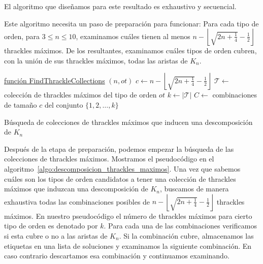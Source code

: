   El algoritmo que diseñamos para este resultado es exhaustivo y secuencial.

  Este algoritmo necesita un paso de preparación para funcionar: Para cada tipo de orden,
  para $3\leq n \leq 10$, examinamos cuáles tienen al menos $n - \left\lfloor\sqrt{2n +
  \frac{1}{4}} - \frac{1}{2}\right\rfloor$ thrackles máximos. De los resultantes,
  examinamos cuáles tipos de orden cubren, con la unión de sus thrackles máximos, todas
  las aristas de $K_n$.

  \begin{algorithm}[t]
    \DontPrintSemicolon
    \underline{función FindThrackleCollections} $(n,ot)$\;
    $c \gets n - \left\lfloor\sqrt{2n + \frac{1}{4}} - \frac{1}{2}\right\rfloor$\;
    $\mathcal{T} \gets $ colección de thrackles máximos del tipo de orden $ot$\;
    $k \gets |\mathcal{T}|$\;
    $C \gets $ combinaciones de tamaño $c$ del conjunto $\{1,2,\dots,k\}$\;
    \caption{Búsqueda de colecciones de thrackles máximos que inducen una descomposición
    de $K_n$}
    \label{algo:descomposicion_thrackles_maximos}
  \end{algorithm}

  Después de la etapa de preparación, podemos empezar la búsqueda de las colecciones de
  thrackles máximos. Mostramos el pseudocódigo en el
  algoritmo~\ref{algo:descomposicion_thrackles_maximos}. Una vez que sabemos cuáles son
  los tipos de orden candidatos a tener una colección de thrackles máximos que induzcan
  una descomposición de $K_n$, buscamos de manera exhaustiva todas las combinaciones
  posibles de $n -  \left\lfloor\sqrt{2n + \frac{1}{4}} - \frac{1}{2}\right\rfloor$
  thrackles máximos. En nuestro pseudocódigo el número de thrackles máximos para cierto
  tipo de orden es denotado por $k$. Para cada una de las combinaciones verificamos si esta cubre o no a las aristas de $K_n$. Si la combinación cubre, almacenamos las etiquetas en una lista
  de soluciones y examinamos la siguiente combinación. En caso contrario descartamos esa
  combinación y continuamos examinando.

